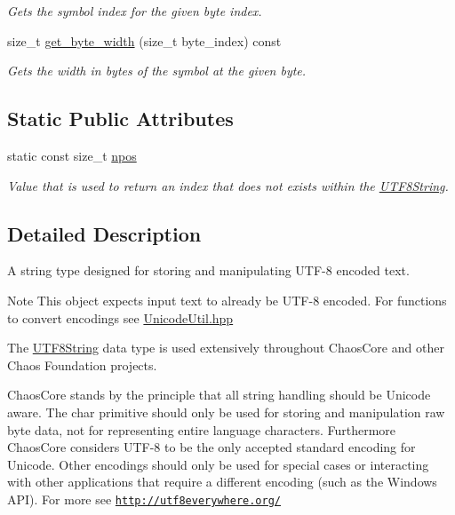 \begin{DoxyCompactItemize}
\begin{DoxyCompactList}\small\item\em Gets the symbol index for the given byte index. \end{DoxyCompactList}\item 
size\+\_\+t \hyperlink{classchaos_1_1str_1_1_u_t_f8_string_a387abdce2189a379961844cd0a42a97a}{get\+\_\+byte\+\_\+width} (size\+\_\+t byte\+\_\+index) const 
\begin{DoxyCompactList}\small\item\em Gets the width in bytes of the symbol at the given byte. \end{DoxyCompactList}\end{DoxyCompactItemize}
\subsection*{Static Public Attributes}
\begin{DoxyCompactItemize}
\item 
\hypertarget{classchaos_1_1str_1_1_u_t_f8_string_a7e301ebfad4cd1b14e3a13cb0595b43b}{}static const size\+\_\+t \hyperlink{classchaos_1_1str_1_1_u_t_f8_string_a7e301ebfad4cd1b14e3a13cb0595b43b}{npos}\label{classchaos_1_1str_1_1_u_t_f8_string_a7e301ebfad4cd1b14e3a13cb0595b43b}

\begin{DoxyCompactList}\small\item\em Value that is used to return an index that does not exists within the \hyperlink{classchaos_1_1str_1_1_u_t_f8_string}{U\+T\+F8\+String}. \end{DoxyCompactList}\end{DoxyCompactItemize}


\subsection{Detailed Description}
A string type designed for storing and manipulating U\+T\+F-\/8 encoded text. 

\begin{DoxyNote}{Note}
This object expects input text to already be U\+T\+F-\/8 encoded. For functions to convert encodings see \hyperlink{_unicode_util_8hpp}{Unicode\+Util.\+hpp}
\end{DoxyNote}
The \hyperlink{classchaos_1_1str_1_1_u_t_f8_string}{U\+T\+F8\+String} data type is used extensively throughout Chaos\+Core and other Chaos Foundation projects.

Chaos\+Core stands by the principle that all string handling should be Unicode aware. The {\ttfamily char} primitive should only be used for storing and manipulation raw byte data, not for representing entire language characters. Furthermore Chaos\+Core considers U\+T\+F-\/8 to be the only accepted standard encoding for Unicode. Other encodings should only be used for special cases or interacting with other applications that require a different encoding (such as the Windows A\+P\+I). For more see \href{http://utf8everywhere.org/}{\tt http\+://utf8everywhere.\+org/}

